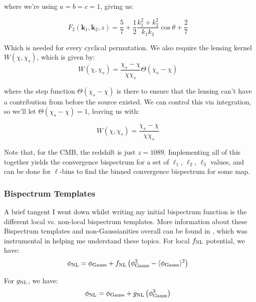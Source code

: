 \documentclass[11pt]{article}
\renewcommand{\_}[1]{\underline{ #1 }}
\begin{document}
{where we're using $a = b = c = 1$, giving us:

\begin{equation}
    F_2(\mathbf{k}_1, \mathbf{k}_2, z) = \frac57 + \frac12 \frac{k_1^2 + k_2^2}{k_1k_2}\cos\theta + \frac27
\end{equation}

Which is needed for every cyclical permutation. We also require the lensing kernel $W(\chi, \chi_s)$, which is given by:
\begin{equation}
    W(\chi, \chi_s) = \frac{\chi_s - \chi}{\chi\chi_s}\Theta(\chi_s - \chi)
\end{equation}

where the step function $\Theta(\chi_s - \chi)$ is there to ensure that the lensing can’t have a contribution from before the source existed. We can control this via integration, so we'll let $\Theta(\chi_s - \chi) = 1$, leaving us with:

\begin{equation}
    W(\chi, \chi_s) = \frac{\chi_s - \chi}{\chi\chi_s}
\end{equation}

Note that, for the CMB, the redshift is just $z = 1089$. Implementing all of this together yields the convergence bispectrum for a set of $\ell_1$, $\ell_2$, $\ell_3$ values, and can be done for $\ell$-bins to find the binned convergence bispectrum for some map.

\subsubsection{Bispectrum Templates}

A brief tangent I went down whilst writing my initial bispectrum function is the different local vs. non-local bispectrum templates. More information about these Bispectrum templates and non-Gaussianities overall can be found in \cite{Woods_2018}, which was instrumental in helping me understand these topics. For local $f_{\rm NL}$ potential, we have:
\begin{equation}
    \phi_{\rm NL} = \phi_{\rm Gauss} + f_{\rm NL} \left(\phi_{\rm Gauss}^2 - \langle\phi_{\rm Gauss}\rangle^2\right)
\end{equation}

For $g_{\rm NL}$, we have:
\begin{equation}
    \phi_{\rm NL} = \phi_{\rm Gauss} + g_{\rm NL}\left(\phi_{\rm Gauss}^3\right)
\end{equation}

}
\end{document}
